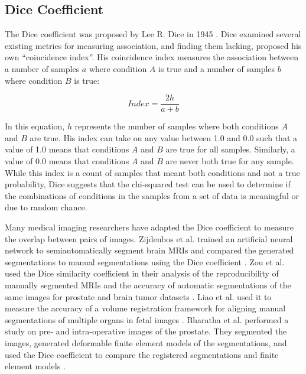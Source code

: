 \subsection{Dice Coefficient}

The Dice coefficient was proposed by Lee R. Dice in 1945 \cite{Dice1945}. Dice examined several existing metrics for measuring association, and finding them lacking, proposed his own ``coincidence index''. His coincidence index measures the association between a number of samples $a$ where condition $A$ is true and a number of samples $b$ where condition $B$ is true:

\begin{equation}
Index = \frac{2h}{a+b}
\end{equation}

In this equation, $h$ represents the number of samples where both conditions $A$ and $B$ are true. His index can take on any value between 1.0 and 0.0 such that a value of 1.0 means that conditions $A$ and $B$ are true for all samples. Similarly, a value of 0.0 means that conditions $A$ and $B$ are never both true for any sample. While this index is a count of samples that meant both conditions and not a true probability, Dice suggests that the chi-squared test can be used to determine if the combinations of conditions in the samples from a set of data is meaningful or due to random chance. 

Many medical imaging researchers have adapted the Dice coefficient to measure the overlap between pairs of images. %
Zijdenbos et al. trained an artificial neural network to semiautomatically segment brain MRIs and compared the generated segmentations to manual segmentations using the Dice coefficient \cite{Zijdenbos1994}.
Zou et al. used the Dice similarity coefficient in their analysis of the reproducibility of manually segmented MRIs and the accuracy of automatic segmentations of the same images for prostate and brain tumor datasets \cite{Zou2004}. 
Liao et al. used it to measure the accuracy of a volume registration framework for aligning manual segmentations of multiple organs in fetal images \cite{Liao2016}. Bharatha et al. performed a study on pre- and intra-operative images of the prostate. They segmented the images, generated deformable finite element models of the segmentations, and used the Dice coefficient to compare the registered segmentations and finite element models \cite{Bharatha2001}.

